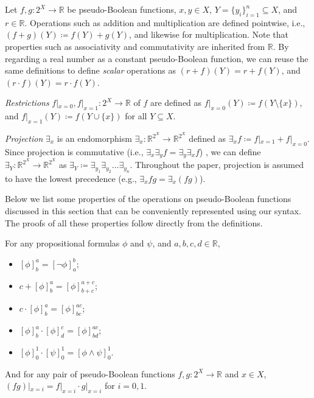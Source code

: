 \begin{definition}[Operations] \label{def:operations}
  Let $f, g\colon 2^X \to \mathbb{R}$ be pseudo-Boolean functions, $x, y \in X$,
  $Y = \{y_i\}_{i=1}^n \subseteq X$, and $r \in \mathbb{R}$. Operations such as
  addition and multiplication are defined pointwise, i.e., $(f+g)(Y) \coloneqq
  f(Y)+g(Y)$, and likewise for multiplication. Note that properties such as
  associativity and commutativity are inherited from $\mathbb{R}$. By regarding
  a real number as a constant pseudo-Boolean function, we can reuse the same
  definitions to define \emph{scalar} operations as $(r+f)(Y) = r+f(Y)$, and $(r
  \cdot f)(Y) = r \cdot f(Y)$.

  \emph{Restrictions} $f|_{x=0}, f|_{x=1}\colon 2^X \to \mathbb{R}$ of $f$ are
  defined as $f|_{x=0}(Y) \coloneqq f(Y \setminus \{x\})$, and $f|_{x=1}(Y)
  \coloneqq f(Y \cup \{x\})$ for all $Y \subseteq X$.

  \emph{Projection} $\exists_x$ is an endomorphism $\exists_x\colon
  \mathbb{R}^{2^X} \to \mathbb{R}^{2^X}$ defined as $\exists_xf \coloneqq
  f|_{x=1} + f|_{x=0}$. Since projection is commutative (i.e.,
  $\exists_x\exists_yf = \exists_y\exists_xf$)
  \citep{DBLP:conf/aaai/DudekPV20,DBLP:conf/cp/DudekPV20}, we can define
  $\exists_Y\colon \mathbb{R}^{2^X} \to \mathbb{R}^{2^X}$ as $\exists_Y
  \coloneqq \exists_{y_1}\exists_{y_2}\dots\exists_{y_n}$. Throughout the paper,
  projection is assumed to have the lowest precedence (e.g., $\exists_x fg =
  \exists_x (fg)$).
\end{definition}

Below we list some properties of the operations on pseudo-Boolean functions
discussed in this section that can be conveniently represented using our syntax.
The proofs of all these properties follow directly from the definitions.

\begin{proposition} \label{prop:basic}
  For any propositional formulas $\phi$ and $\psi$, and $a, b, c, d \in
  \mathbb{R}$,
  \begin{itemize}
  \item $[\phi]^a_b = [\neg \phi]^b_a$;
  \item $c + [\phi]^a_b = [\phi]^{a+c}_{b+c}$;
  \item $c \cdot [\phi]^a_b = [\phi]^{ac}_{bc}$;
  \item $[\phi]^a_b \cdot [\phi]^c_d = [\phi]^{ac}_{bd}$;
  \item $[\phi]^1_0 \cdot [\psi]_0^1 = [\phi \land \psi]_0^1$.
  \end{itemize}
  And for any pair of pseudo-Boolean functions $f, g \colon 2^X \to \mathbb{R}$
  and $x \in  X$, $(fg)|_{x=i} = f|_{x=i} \cdot g|_{x=i}$ for $i = 0, 1$.
\end{proposition}

